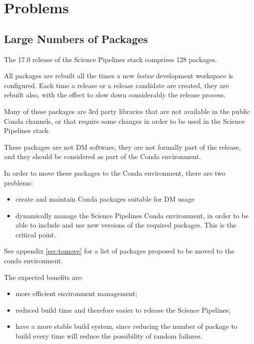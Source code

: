 \newpage
\section{Problems}

\subsection{Large Numbers of Packages} \label{sec:high}

The 17.0 release of the Science Pipelines stack comprises 128 packages.

All packages are rebuilt all the times a new \textit{lsstsw} development workspace is configured. 
Each time a release or a release candidate are created, they are rebuilt also, with the effect to slow down considerably the release process.

Many of these packages are 3rd party libraries that are not available in the public Conda channels, or that require some changes in order to be used in the Science Pipelines stack.

These packages are not DM software, they are not formally part of the release, and they should be considered as part of the Conda environment.

In order to move these packages to the Conda environment, there are two problems:

\begin{itemize}
\item create and maintain Conda packages suitable for DM usage
\item dynamically manage the Science Pipelines Conda environment, in order to be able to include and use new versions of the required packages. This is the critical point.
\end{itemize}

See appendix \ref{sec:tomove} for a list of packages proposed to be moved to the conda environment.

The expected benefits are:

\begin{itemize}
\item more efficient environment management;
\item reduced build time and therefore easier to release the Science Pipelines;
\item have a more stable build system, since reducing the number of package to build every time will reduce the possibility of random failures.
\end{itemize}



